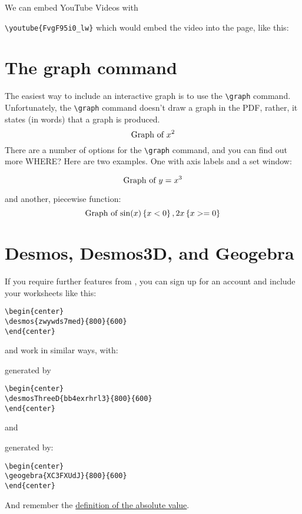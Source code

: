 \documentclass{ximera}
\begin{document}
We can embed YouTube Videos with

\verb|\youtube{FvgF95i0_lw}| which would embed the video into the page, like
this:
\begin{center}
\end{center}

\section{The graph command}

The easiest way to include an interactive graph is to use the
\verb|\graph| command. Unfortunately, the \verb|\graph| command
doesn't draw a graph in the PDF, rather, it states (in words) that a
graph is produced.
\[
  \graph{x^2}
\]
There are a number of options for the \verb|\graph| command, and you can find
out more WHERE?
Here are two examples. One with axis labels and a set window:

\[
  \graph[xAxisLabel="time", yAxisLabel="distance",xmin=0, xmax=10, ymin=0,
    ymax=10]{y=x^3}
\]

and another, piecewise function:
\[
  \graph{ \sin(x)\left\{x<0\right\}, 2x\left\{ x>=0 \right\} }
\]


\section{Desmos, Desmos3D, and Geogebra}

If you require further features from
, you can sign up for an account
and include your worksheets like this:

\begin{verbatim}
\begin{center}
\desmos{zwywds7med}{800}{600}
\end{center}
\end{verbatim}
\begin{center}
\end{center}

 and
 work in similar ways,
with:
\begin{center}
\end{center}
generated by
\begin{verbatim}
\begin{center}
\desmosThreeD{bb4exrhrl3}{800}{600}
\end{center}
\end{verbatim}
and
\begin{center}
\end{center}
generated by:
\begin{verbatim}
\begin{center}
\geogebra{XC3FXUdJ}{800}{600}
\end{center}
\end{verbatim}

And remember the \hyperref[def:absolute_value]{definition of the absolute value}.
\end{document}
